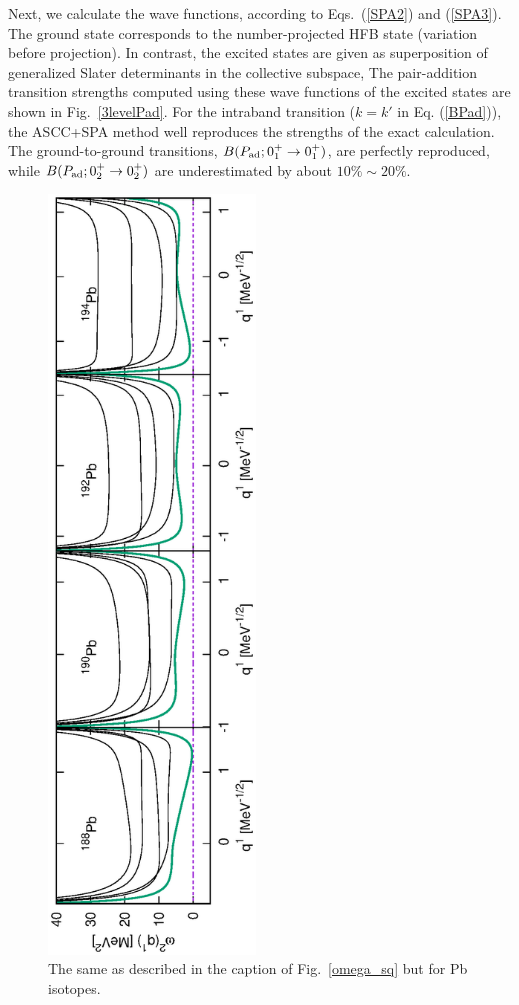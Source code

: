 \documentclass[11pt]{book} %
\begin{document}
Next, we calculate the wave functions,
according to Eqs.~(\ref{SPA2}) and (\ref{SPA3}).
The ground state corresponds to the number-projected HFB state
(variation before projection).
In contrast, the excited states are given as superposition of
generalized Slater determinants in the collective subspace,
The pair-addition transition strengths
computed using these wave functions of the excited states
are shown in Fig.~\ref{3levelPad}.
For the intraband transition ($k=k'$ in Eq. (\ref{BPad})),
the ASCC+SPA method well reproduces the strengths of the exact calculation.
The ground-to-ground transitions, $B(P_{\rm ad};0_1^+\rightarrow 0_1^+)$, 
are perfectly reproduced, while
$B(P_{\rm ad};0_2^+\rightarrow 0_2^+)$ are underestimated 
by about $10\%\sim20\%$.
\begin{figure}[tb]
 \begin{center}
  \includegraphics[width=55mm,angle=-90]{images/Pbomega_sq.eps}
 \end{center}
	\caption{The same as described in the caption of Fig.~\ref{omega_sq} but for Pb isotopes.
}
 \label{Pb_omega_sq}
\end{figure}
\end{document}
